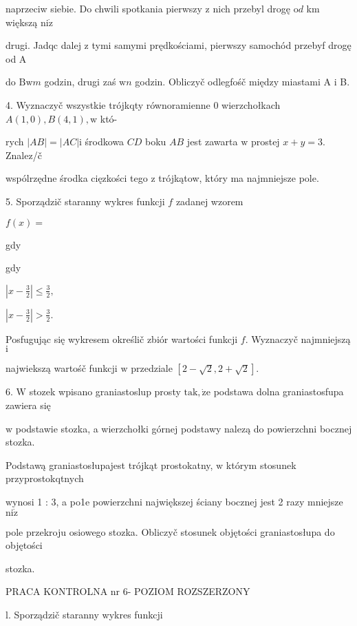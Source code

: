 \documentclass[a4paper,12pt]{article}
\begin{document}
naprzeciw siebie. Do chwili spotkania pierwszy $\mathrm{z}$ nich przebyl drogę $\mathrm{o}d$ km większą $\mathrm{n}\mathrm{i}\dot{\mathrm{z}}$

drugi. Jadqc dalej $\mathrm{z}$ tymi samymi prędkościami, pierwszy samochód przebyf drogę od $\mathrm{A}$

do $\mathrm{B}\mathrm{w}m$ godzin, drugi zaś $\mathrm{w}n$ godzin. Obliczyč odlegfośč między miastami A $\mathrm{i}$ B.

4. Wyznaczyč wszystkie trójkqty równoramienne $0$ wierzchołkach $A(1,0), B(4,1), \mathrm{w}$ któ-

rych $|AB| = |AC| \mathrm{i}$ środkowa $CD$ boku $AB$ jest zawarta $\mathrm{w}$ prostej $x+y=3$. Znalez/č

wspólrzędne środka cięzkości tego $\mathrm{z}$ trójkątow, który ma najmniejsze pole.

5. Sporządzič staranny wykres funkcji $f$ zadanej wzorem

$f(x)=$

gdy

gdy

$|x-\displaystyle \frac{3}{2}|\leq\frac{3}{2},$

$|x-\displaystyle \frac{3}{2}|>\frac{3}{2}.$

Posfugując się wykresem określič zbiór wartości funkcji $f$. Wyznaczyč najmniejszą $\mathrm{i}$

najwiekszą wartośč funkcji $\mathrm{w}$ przedziale $[2-\sqrt{2},2+\sqrt{2}].$

6. $\mathrm{W}$ stozek wpisano graniastoslup prosty $\mathrm{t}\mathrm{a}\mathrm{k}, \dot{\mathrm{z}}\mathrm{e}$ podstawa dolna graniastosfupa zawiera się

$\mathrm{w}$ podstawie stozka, a wierzchołki górnej podstawy nalezą do powierzchni bocznej stozka.

Podstawą graniastosłupajest trójkąt prostokatny, $\mathrm{w}$ którym stosunek przyprostokqtnych

wynosi 1 : 3, a po1e powierzchni największej ściany bocznej jest 2 razy mniejsze $\mathrm{n}\mathrm{i}\dot{\mathrm{z}}$

pole przekroju osiowego stozka. Obliczyč stosunek objętości graniastosłupa do objętości

stozka.





PRACA KONTROLNA nr 6- POZIOM ROZSZERZONY

l. Sporządzič staranny wykres funkcji
\end{document}
